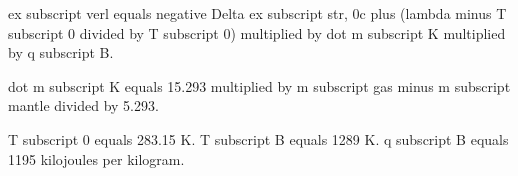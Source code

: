 ex subscript verl equals negative Delta ex subscript str, 0c plus (lambda minus T subscript 0 divided by T subscript 0) multiplied by dot m subscript K multiplied by q subscript B.  

dot m subscript K equals 15.293 multiplied by m subscript gas minus m subscript mantle divided by 5.293.  

T subscript 0 equals 283.15 K.  
T subscript B equals 1289 K.  
q subscript B equals 1195 kilojoules per kilogram.